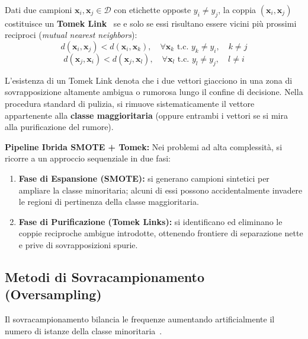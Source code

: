 \begin{definition}
Dati due campioni $\mathbf{x}_i, \mathbf{x}_j \in \mathcal{D}$ con etichette opposte $y_i \neq y_j$, la coppia $(\mathbf{x}_i, \mathbf{x}_j)$ costituisce un \textbf{Tomek Link}~\cite{tomek1976} se e solo se essi risultano essere vicini più prossimi reciproci (\textit{mutual nearest neighbors}):
\begin{equation}
    d(\mathbf{x}_i, \mathbf{x}_j) < d(\mathbf{x}_i, \mathbf{x}_k), \quad \forall \mathbf{x}_k \text{ t.c. } y_k \neq y_i, \quad k \neq j
\end{equation}
\begin{equation}
    d(\mathbf{x}_j, \mathbf{x}_i) < d(\mathbf{x}_j, \mathbf{x}_l), \quad \forall \mathbf{x}_l \text{ t.c. } y_l \neq y_j, \quad l \neq i
\end{equation}
\end{definition}

L'esistenza di un Tomek Link denota che i due vettori giacciono in una zona di sovrapposizione altamente ambigua o rumorosa lungo il confine di decisione. Nella procedura standard di pulizia, si rimuove sistematicamente il vettore appartenente alla \textbf{classe maggioritaria} (oppure entrambi i vettori se si mira alla purificazione del rumore).

\textbf{Pipeline Ibrida SMOTE + Tomek:}
Nei problemi ad alta complessità, si ricorre a un approccio sequenziale in due fasi:
\begin{enumerate}
    \item \textbf{Fase di Espansione (SMOTE):} si generano campioni sintetici per ampliare la classe minoritaria; alcuni di essi possono accidentalmente invadere le regioni di pertinenza della classe maggioritaria.
    \item \textbf{Fase di Purificazione (Tomek Links):} si identificano ed eliminano le coppie reciproche ambigue introdotte, ottenendo frontiere di separazione nette e prive di sovrapposizioni spurie.
\end{enumerate}

\FloatBarrier
\subsection{Metodi di Sovracampionamento (Oversampling)}
\label{subsec:dm-oversampling}

Il sovracampionamento bilancia le frequenze aumentando artificialmente il numero di istanze della classe minoritaria~\cite{mannocci2026imbalanced}.

